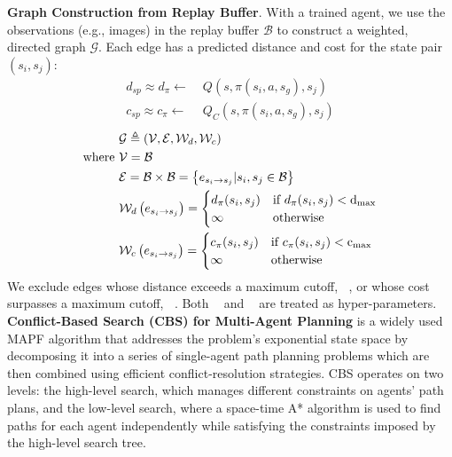 \documentclass[letterpaper, 10 pt, conference]{IEEEConference}
\DeclareMathOperator*{\maxdist}{d_{\text{max}}}
\DeclareMathOperator*{\maxcost}{c_{\text{max}}}
\begin{document}
\textbf{Graph Construction from Replay Buffer}. With a trained agent, we use the observations (e.g., images) in the replay buffer $\mathcal{B}$ to construct a weighted, directed graph $\mathcal{G}$. Each edge has a predicted distance and cost for the state pair $(s_i, s_j)$:
\begin{align}
    d_{sp} \approx d_{\pi} \gets & \; Q(s,\pi(s_{i},a,s_{g}),s_{j})
    \label{eq:predict_dist} \\
    c_{sp} \approx c_{\pi} \gets & \; Q_{C}(s,\pi(s_{i},a,s_{g}),s_{j})
    \label{eq:predict_cost}
\end{align}
\begin{align*} 
    & \mathcal{G} \triangleq \left( \mathcal{V}, \mathcal{E}, \mathcal{W}_{d}, \mathcal{W}_{c} \right) \\
    \textnormal{where } & \mathcal{V} = \mathcal{B} \\
    & \mathcal{E} = \mathcal{B} \times \mathcal{B} = \left\{ e_{s_{i}\rightarrow s_{j}} \vert s_{i}, s_{j} \in \mathcal{B} \right\} \\
    & \mathcal{W}_{d} \left( e_{s_{i} \rightarrow s_{j}} \right) = 
        \begin{cases}
            d_{\pi}(s_{i}, s_{j}) & \textnormal{if }d_{\pi}(s_{i}, s_{j}) < \maxdist \\
            \infty & \textnormal{otherwise}
        \end{cases} \\
    & \mathcal{W}_{c} \left( e_{s_{i} \rightarrow s_{j}} \right) = 
        \begin{cases}
            c_{\pi}(s_{i}, s_{j}) & \textnormal{if }c_{\pi}(s_{i}, s_{j}) < \maxcost \\
            \infty & \textnormal{otherwise}
        \end{cases}
\end{align*}
We exclude edges whose distance exceeds a maximum cutoff, $\maxdist$, or whose cost surpasses a maximum cutoff, $\maxcost$. Both $\maxdist$ and $\maxcost$ are treated as hyper-parameters.
\textbf{Conflict-Based Search (CBS) for Multi-Agent Planning} \cite{sharon-cbs} is a widely used MAPF algorithm that addresses the problem's exponential state space by decomposing it into a series of single-agent path planning problems which are then combined using efficient conflict-resolution strategies. CBS operates on two levels: the high-level search, which manages different constraints on agents' path plans, and the low-level search, where a space-time A* algorithm is used to find paths for each agent independently while satisfying the constraints imposed by the high-level search tree.
\end{document}
